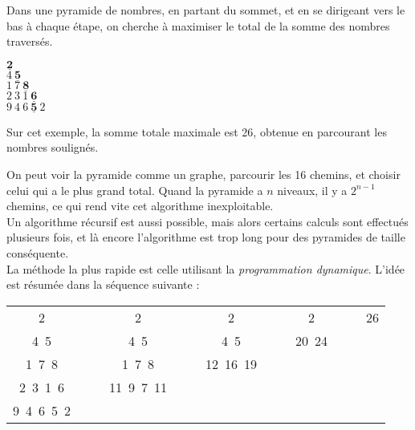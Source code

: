 Dans une pyramide de nombres, en partant du sommet, et en se dirigeant vers le bas à 
chaque étape, on cherche à maximiser le total de la somme des nombres traversés.

\begin{center}
$ \underline{\textbf{2}}$\\$4\ \underline{\textbf{5}}$\\$1\ 7\ 
\underline{\textbf{8}}$\\$2\ 3\ 1\ \underline{\textbf{6}}$\\$9\ 4\ 6\ 
\underline{\textbf{5}}\ 2$\end{center}

Sur cet exemple, la somme totale maximale est 26, obtenue en parcourant les nombres soulignés.


On peut voir la pyramide comme un graphe, parcourir les 16 chemins, et choisir celui qui 
a le plus grand total. Quand la pyramide a $n$ niveaux, il y a $2^{n-1}$ chemins, ce qui 
rend vite cet algorithme inexploitable.\\
Un algorithme récursif est aussi possible, mais alors certains calculs sont effectués 
plusieurs fois, et là encore l'algorithme est trop long pour des pyramides de taille 
conséquente.\\
La méthode la plus rapide est celle utilisant la \emph{programmation dynamique}. L'idée 
est résumée dans la séquence suivante :

\begin{center}
\begin{tabular}{ccccccccccccc}
 2 &\hspace{1cm}&& 2 &\hspace{1cm}&& 2 &\hspace{1cm}&& 2&\hspace{1cm}& &26\\
 4\ 5 &\hspace{1cm}&& 4\ 5 &\hspace{1cm}&& 4\ 5 &\hspace{1cm}&& 20\ 24 &\hspace{1cm}&&\\
 1\ 7\ 8 &\hspace{1cm}&& 1\ 7\ 8&\hspace{1cm}&& 12\ 16\ 19 &\hspace{1cm}&& 
&\hspace{1cm}&&\\
 2\ 3\ 1\ 6 &\hspace{1cm}&& 11\ 9\ 7\ 11 &\hspace{1cm}&& &\hspace{1cm}&& &\hspace{1cm}&& 
\\
 9\ 4\ 6\ 5\ 2 &\hspace{1cm}&& &\hspace{1cm}&& &\hspace{1cm}&& &\hspace{1cm}&&
\end{tabular}
\end{center}

